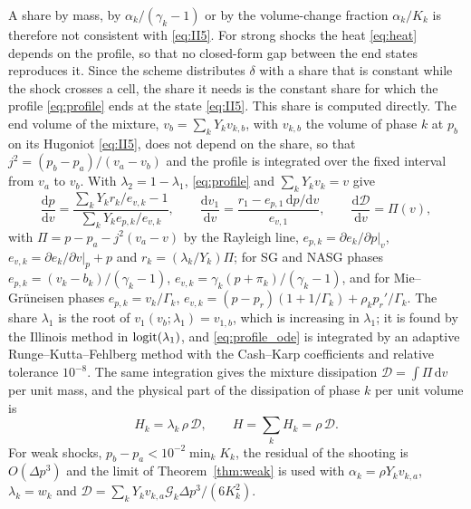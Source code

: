 \documentclass[a4paper,fleqn]{cas-sc}
\begin{document}
A share by mass, by $\alpha_k/(\gamma_k-1)$ or by the volume-change fraction $\alpha_k/K_k$ is therefore not consistent with
\eqref{eq:II5}. For strong shocks the heat \eqref{eq:heat} depends on the profile, so that no closed-form gap between the end states
reproduces it. Since the scheme distributes $\delta$ with a share that is constant while the shock crosses a cell, the
share it needs is the constant share for which the profile \eqref{eq:profile} ends at the state \eqref{eq:II5}. This share is
computed directly. The end volume of the mixture, $v_b=\sum_kY_kv_{k,b}$, with $v_{k,b}$ the volume of phase $k$ at $p_b$ on its
Hugoniot \eqref{eq:II5}, does not depend on the share, so that $j^2=(p_b-p_a)/(v_a-v_b)$ and the profile is integrated over
the fixed interval from $v_a$ to $v_b$. With $\lambda_2=1-\lambda_1$, \eqref{eq:profile} and $\sum_kY_kv_k=v$ give
\begin{equation}
\frac{\mathrm dp}{\mathrm dv}=\frac{\sum_kY_kr_k/e_{v,k}-1}{\sum_kY_ke_{p,k}/e_{v,k}},\qquad
\frac{\mathrm dv_1}{\mathrm dv}=\frac{r_1-e_{p,1}\,\mathrm dp/\mathrm dv}{e_{v,1}},\qquad
\frac{\mathrm d\mathcal D}{\mathrm dv}=\Pi(v),
\label{eq:profile_ode}
\end{equation}
with $\Pi=p-p_a-j^2(v_a-v)$ by the Rayleigh line, $e_{p,k}=\partial e_k/\partial p|_{v}$, $e_{v,k}=\partial e_k/\partial v|_{p}+p$ and $r_k=(\lambda_k/Y_k)\Pi$; for SG and NASG phases
$e_{p,k}=(v_k-b_k)/(\gamma_k-1)$, $e_{v,k}=\gamma_k(p+\pi_k)/(\gamma_k-1)$, and for Mie--Gr\"uneisen phases $e_{p,k}=v_k/\Gamma_k$,
$e_{v,k}=(p-p_r)(1+1/\Gamma_k)+\rho_kp_r'/\Gamma_k$. The share $\lambda_1$ is the root of $v_1(v_b;\lambda_1)=v_{1,b}$, which is increasing in $\lambda_1$; it is
found by the Illinois method in ${\rm logit}(\lambda_1)$, and \eqref{eq:profile_ode} is integrated by an adaptive Runge--Kutta--Fehlberg method
with the Cash--Karp coefficients and relative tolerance $10^{-8}$. The same integration gives the mixture dissipation $\mathcal D=\int\Pi\,\mathrm dv$ per
unit mass, and the physical part of the dissipation of phase $k$ per unit volume is
\begin{equation}
H_k=\lambda_k\,\rho\,\mathcal D,\qquad H=\sum_kH_k=\rho\,\mathcal D .
\label{eq:Qk}
\end{equation}
For weak shocks, $p_b-p_a<10^{-2}\min_kK_k$, the residual of the shooting is $O(\Delta p^3)$ and the limit of
Theorem~\ref{thm:weak} is used with $\alpha_k=\rho Y_kv_{k,a}$, $\lambda_k=w_k$ and
$\mathcal D=\sum_kY_kv_{k,a}\mathcal G_k\Delta p^3/(6K_k^2)$.
\end{document}
